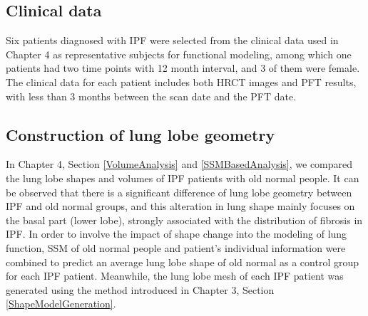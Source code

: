 \subsection{Clinical data}
Six patients diagnosed with IPF were selected from the clinical data used in Chapter 4 as representative subjects for functional modeling, among which one patients had two time points with 12 month interval, and 3 of them were female. The clinical data for each patient includes both HRCT images and PFT results, with less than 3 months between the scan date and the PFT date. 

\subsection{Construction of lung lobe geometry}
In Chapter 4, Section \ref{VolumeAnalysis} and \ref{SSMBasedAnalysis}, we compared the lung lobe shapes and volumes of IPF patients with old normal people. It can be observed that there is a significant difference of lung lobe geometry between IPF and old normal groups, and this alteration in lung shape mainly focuses on the basal part (lower lobe), strongly associated with the distribution of fibrosis in IPF. In order to involve the impact of shape change into the modeling of lung function, SSM of old normal people and patient's individual information were combined to predict an average lung lobe shape of old normal as a control group for each IPF patient. Meanwhile, the lung lobe mesh of each IPF patient was generated using the method introduced in Chapter 3, Section \ref{ShapeModelGeneration}.

